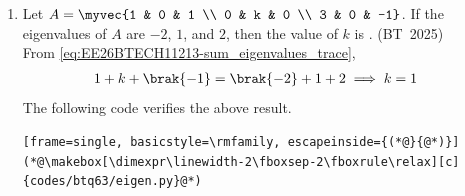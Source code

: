 \begin{enumerate}[label=\thesubsection.\arabic*, ref=\thesubsection.\theenumi,itemsep=0pt]
Applying the stopping threshold condition $\abs{1 - a_n} < \frac{1}{2^{10}}$:
\begin{align}
\abs{1 - \brak{1 - 2^{-n}}} &< \frac{1}{2^{10}} \\
2^{-n} &< 2^{-10} \\
2^n &> 2^{10} \implies n > 10
\end{align}

Since $n$ must be an integer, the minimal integer satisfying the strict inequality is:
\begin{align}
n = 11
\end{align}

The implementation in C to simulate the recurrence and verify the threshold is as follows:

\begin{lstlisting}[frame=single, basicstyle=\rmfamily, escapeinside={(*@}{@*)}]
(*@\makebox[\dimexpr\linewidth-2\fboxsep-2\fboxrule\relax][c]{codes/btq59/ztransform.c}@*)
\end{lstlisting}

%
\item Let $A = \myvec{1 & 0 & 1 \\ 0 & k & 0 \\ 3 & 0 & -1}$. If the eigenvalues of $A$ are $-2$, $1$, and $2$, then the value of $k$ is \underline{\hspace{2cm}}.
\hfill (BT~2025)
\\
%
\solution
From \eqref{eq:EE26BTECH11213-sum_eigenvalues_trace}, 
\begin{align}
	1 + k + \brak{-1} &=\brak{-2} + 1 + 2 
\implies k =  1
\end{align}
The following code verifies the above result.
%
\begin{lstlisting}[frame=single, basicstyle=\rmfamily, escapeinside={(*@}{@*)}]
(*@\makebox[\dimexpr\linewidth-2\fboxsep-2\fboxrule\relax][c]{codes/btq63/eigen.py}@*)
\end{lstlisting}

\end{enumerate}
